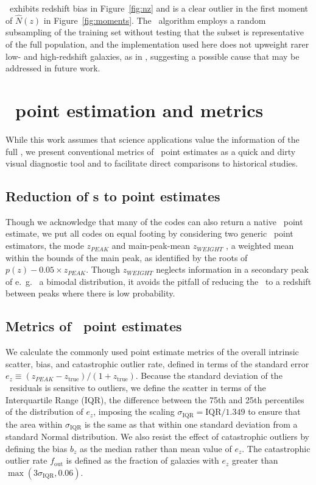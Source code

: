 \skynet\ exhibits redshift bias in Figure~\ref{fig:nz} and is a clear outlier in the first moment of $\hat{N}(z)$ in Figure~\ref{fig:moments}.
The \skynet\ algorithm employs a random subsampling of the training set without testing that the subset is representative of the full population, and the implementation used here does not upweight rarer low- and high-redshift galaxies, as in \citet{Bonnett:15}, suggesting a possible cause that may be addressed in future work.

\section{\Pz\ point estimation and metrics}
\label{sec:pointmetrics}

While this work assumes that science applications value the information of the full \pzpdf, we present conventional metrics of \pz\ point estimates as a quick and dirty visual diagnostic tool and to facilitate direct comparisons to historical studies.

\subsection{Reduction of \pzpdf s to point estimates}
\label{sec:pointest}

Though we acknowledge that many of the codes can also return a native \pz\ point estimate, we put all codes on equal footing by considering two generic \pz\ point estimators, the mode $z_{PEAK}$ and main-peak-mean $z_{WEIGHT}$ \citep{Dahlen:13}, a weighted mean within the bounds of the main peak, as identified by the roots of $p(z) - 0.05 \times z_{PEAK}$.
Though $z_{WEIGHT}$ neglects information in a secondary peak of e.~g.~ a bimodal distribution, it avoids the pitfall of reducing the \pzpdf\ to a redshift between peaks where there is low probability.

\subsection{Metrics of \pz\ point estimates}
\label{sec:point_metrics}

We calculate the commonly used point estimate metrics of the overall intrinsic scatter, bias, and catastrophic outlier rate, defined in terms of the standard error $e_{z} \equiv (z_{PEAK} - z_{\mathrm{true}}) / (1 + z_{\mathrm{true}})$.
Because the standard deviation of the \pz\ residuals is sensitive to outliers, we define the scatter in terms of the Interquartile Range (IQR), the difference between the 75th and 25th percentiles of the distribution of $e_{z}$, imposing the scaling $\sigma_{\mathrm{IQR}} = \mathrm{IQR} / 1.349$ to ensure that the area within $\sigma_{\mathrm{IQR}}$ is the same as that within one standard deviation from a standard Normal distribution.
We also resist the effect of catastrophic outliers by defining the bias $b_{z}$ as the median rather than mean value of $e_{z}$.
The catastrophic outlier rate $f_{\mathrm{out}}$ is defined as the fraction of galaxies with $e_{z}$ greater than $\max(3 \sigma_{\mathrm{IQR}}, 0.06)$.

